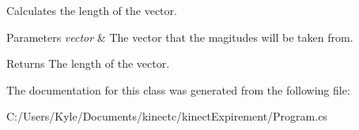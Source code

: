 Calculates the length of the vector. 


\begin{DoxyParams}{Parameters}
{\em vector} & The vector that the magitudes will be taken from. \\
\hline
\end{DoxyParams}
\begin{DoxyReturn}{Returns}
The length of the vector. 
\end{DoxyReturn}


The documentation for this class was generated from the following file\+:\begin{DoxyCompactItemize}
\item 
C\+:/\+Users/\+Kyle/\+Documents/kinectc/kinect\+Expirement/Program.\+cs\end{DoxyCompactItemize}
